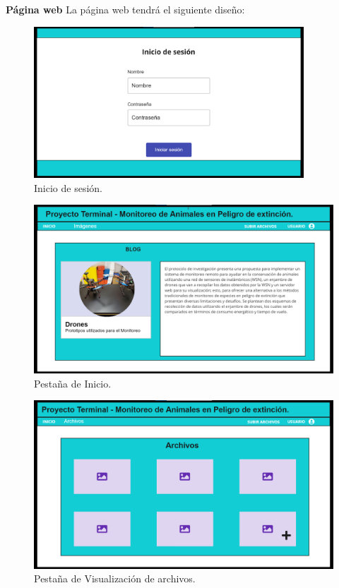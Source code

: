  \noindent \textbf{\large Página web} \newline
La página web tendrá el siguiente diseño:
\begin{figure}[H]
    \centering
    \includegraphics[width=0.9\textwidth]{imagenes/loggin}
    \caption{Inicio de sesión.}
\end{figure}
\begin{figure}[H]
    \centering
    \includegraphics[width=.9\textwidth]{imagenes/index}
    \caption{Pestaña de Inicio.}
\end{figure}
\begin{figure}[H]
    \centering
    \includegraphics[width=.9\textwidth]{imagenes/files}
    \caption{Pestaña de Visualización de archivos.}
\end{figure}

